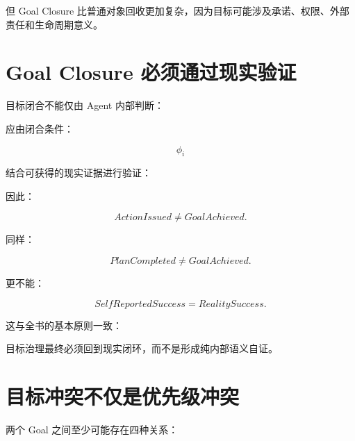 但 Goal Closure 比普通对象回收更加复杂，因为目标可能涉及承诺、权限、外部责任和生命周期意义。


\section{Goal Closure 必须通过现实验证}

目标闭合不能仅由 Agent 内部判断：

\begin{statementbox}
\centering
{}
\end{statementbox}

应由闭合条件：

\[
\phi_i
\]

结合可获得的现实证据进行验证：

\begin{statementbox}
\centering
{}
\end{statementbox}

因此：

\[
ActionIssued
\neq
GoalAchieved.
\]

同样：

\[
PlanCompleted
\neq
GoalAchieved.
\]

更不能：

\[
SelfReportedSuccess
=
RealitySuccess.
\]

这与全书的基本原则一致：

\begin{statementbox}
\centering
{}
\end{statementbox}

目标治理最终必须回到现实闭环，而不是形成纯内部语义自证。


\section{目标冲突不仅是优先级冲突}

两个 Goal 之间至少可能存在四种关系：

\begin{statementbox}
\centering
{}
\end{statementbox}

